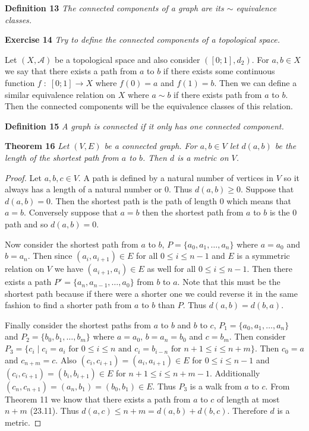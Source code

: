 \documentclass{article}
\begin{document}
\begin{flushleft}
\textbf{Definition 13}
\textsl{The connected components of a graph are its $\sim$ equivalence classes.}\newline

\textbf{Exercise 14}
\textsl{Try to define the connected components of a topological space.}\newline

Let $(X, \mathcal{A})$ be a topological space and also consider $([0;1],d_2)$. For $a,b \in X$ we say that there exists a path from $a$ to $b$ if there exists some continuous function $f \; : \; [0;1] \rightarrow X$ where $f(0) = a$ and $f(1) = b$. Then we can define a similar equivalence relation on $X$ where $a \sim b$ if there exists path from $a$ to $b$. Then the connected components will be the equivalence classes of this relation.

\textbf{Definition 15}
\textsl{A graph is connected if it only has one connected component.}\newline

\textbf{Theorem 16}
\textsl{Let $(V,E)$ be a connected graph. For $a,b \in V$ let $d(a,b)$ be the length of the shortest path from $a$ to $b$. Then $d$ is a metric on $V$.}
\begin{proof}
Let $a,b,c \in V$. A path is defined by a natural number of vertices in $V$ so it always has a length of a natural number or $0$. Thus $d(a,b) \geq 0$. Suppose that $d(a,b) = 0$. Then the shortest path is the path of length $0$ which means that $a=b$. Conversely suppose that $a=b$ then the shortest path from $a$ to $b$ is the $0$ path and so $d(a,b) = 0$.\newline

Now consider the shortest path from $a$ to $b$, $P = \{a_0, a_1, \dots , a_n\}$ where $a = a_0$ and $b = a_n$. Then since $(a_i, a_{i+1}) \in E$ for all $0 \leq i \leq n-1$ and $E$ is a symmetric relation on $V$ we have $(a_{i+1}, a_i) \in E$ as well for all $0 \leq i \leq n-1$. Then there exists a path $P' = \{a_n, a_{n-1}, \dots , a_0\}$ from $b$ to $a$. Note that this must be the shortest path because if there were a shorter one we could reverse it in the same fashion to find a shorter path from $a$ to $b$ than $P$. Thus $d(a,b) = d(b,a)$.\newline

Finally consider the shortest paths from $a$ to $b$ and $b$ to $c$, $P_1 = \{a_0, a_1, \dots , a_n\}$ and $P_2 = \{b_0, b_1, \dots , b_m\}$ where $a = a_0$, $b = a_n = b_0$ and $c = b_m$. Then consider $P_3 = \{c_i \mid \text{$c_i = a_i$ for $0 \leq i \leq n$ and $c_i = b_{i-n}$ for $n+1 \leq i \leq n+m$}\}$. Then $c_0 = a$ and $c_{n+m} = c$. Also $(c_i, c_{i+1}) = (a_i, a_{i+1}) \in E$ for $0 \leq i \leq n-1$ and $(c_i, c_{i+1}) = (b_i, b_{i+1}) \in E$ for $n+1 \leq i \leq n+m-1$. Additionally $(c_n, c_{n+1}) = (a_n, b_1) = (b_0, b_1) \in E$. Thus $P_3$ is a walk from $a$ to $c$. From Theorem 11 we know that there exists a path from $a$ to $c$ of length at most $n+m$ (23.11). Thus $d(a,c) \leq n+m = d(a,b) + d(b,c)$. Therefore $d$ is a metric.
\end{proof}


\end{flushleft}
\end{document}
